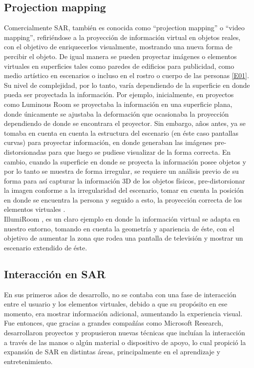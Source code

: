 \documentclass[a4paper,openright,12pt]{report}
\begin{document}
\subsection{Projection mapping}
Comercialmente SAR, también es conocida como ``projection mapping'' o ``video mapping'', refiriéndose a la proyección de información virtual en objetos reales, con el objetivo de enriquecerlos visualmente, mostrando una nueva forma de percibir el objeto. De igual manera se pueden proyectar imágenes o elementos virtuales en superficies tales como paredes de edificios para publicidad, como medio artístico en escenarios o incluso en el rostro o cuerpo de las personas \hyperlink{e01}{[E01]}.\\
Su nivel de complejidad, por lo tanto, varía dependiendo de la superficie en donde pueda ser proyectada la información. Por ejemplo, inicialmente, en proyectos como Luminous Room \cite{Under1997} se proyectaba la información en una superficie plana, donde únicamente se ajustaba la deformación que ocasionaba la proyección dependiendo de donde se encontrara el proyector. Sin embargo, años antes, ya se tomaba en cuenta en cuenta la estructura del escenario \cite{Dorsey1991} (en éste caso pantallas curvas) para proyectar información, en donde generaban las imágenes pre-distorsionadas para que luego se pudiese visualizar de la forma correcta. En cambio, cuando la superficie en donde se proyecta la información posee objetos y por lo tanto se muestra de forma irregular, se requiere un análisis previo de su forma para así capturar la información 3D de los objetos físicos, pre-distorsionar la imagen conforme a la irregularidad del escenario, tomar en cuenta la posición en donde se encuentra la persona y seguido a esto, la proyección correcta de los elementos virtuales \cite{Raskar1998b,Raskar2001,Starner2003,Wilson2007}.\\
IllumiRoom \cite{jones2013}, es un claro ejemplo en donde la información virtual se adapta en nuestro entorno, tomando en cuenta la geometría y apariencia de éste, con el objetivo de aumentar la zona que rodea una pantalla de televisión y mostrar un escenario extendido de éste.
\subsection{Interacción en SAR}
En sus primeros años de desarrollo, no se contaba con una fase de interacción entre el usuario y los elementos virtuales, debido a que su propósito en ese momento, era mostrar información adicional, aumentando la experiencia visual. Fue entonces, que gracias a grandes compañías como Microsoft Research, desarrollaron proyectos y propusieron nuevas técnicas que incluían la interacción a través de las manos o algún material o dispositivo de apoyo, lo cual propició la expansión de SAR en distintas áreas, principalmente en el aprendizaje y entretenimiento.\\
\end{document}
